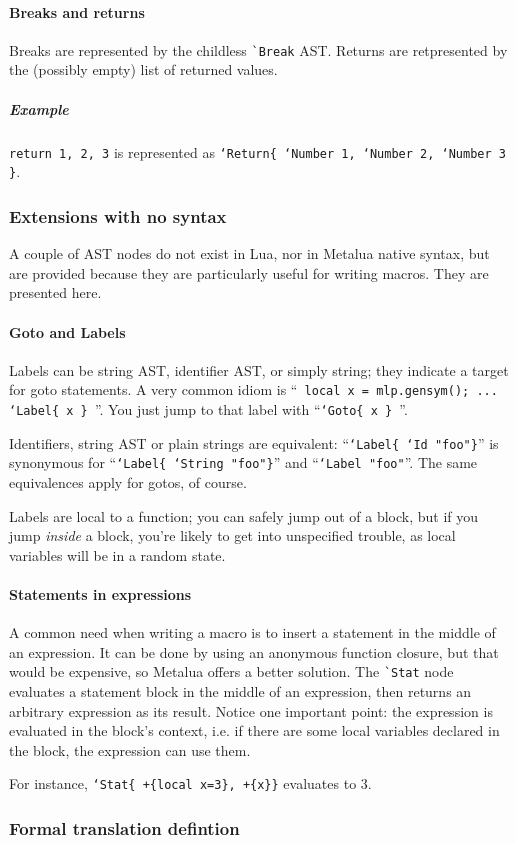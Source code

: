 \paragraph{Breaks and returns} 
Breaks are represented by the childless \verb|`Break| AST. Returns are
retpresented by the (possibly empty) list of returned values.

\subparagraph{Example}
{\tt return 1, 2, 3} is represented as {\tt`Return\{ `Number 1, `Number
    2, `Number 3 \}}.

\subsubsection{Extensions with no syntax}

A couple of AST nodes do not exist in Lua, nor in Metalua native
syntax, but are provided because they are particularly useful for
writing macros. They are presented here.

\paragraph{Goto and Labels}

Labels can be string AST, identifier AST, or simply string; they
indicate a target for goto statements.  A very common idiom is ``{\tt
  local x = mlp.gensym(); ... `Label\{ x \} }''. You just jump to that
label with ``{\tt `Goto\{ x \} }''.

Identifiers, string AST or plain strings are equivalent: 
``{\tt`Label\{ `Id "foo"\}}'' is synonymous for ``{\tt`Label\{ `String
  "foo"\}}'' and ``{\tt`Label "foo"}''. The same equivalences apply
for gotos, of course.

Labels are local to a function; you can safely jump out of a block,
but if you jump {\em inside} a block, you're likely to get into unspecified
trouble, as local variables will be in a random state.

\paragraph{Statements in expressions}
A common need when writing a macro is to insert a statement in the
middle of an expression. It can be done by using an anonymous function
closure, but that would be expensive, so Metalua offers a better
solution. The \verb|`Stat| node evaluates a statement block in the
middle of an expression, then returns an arbitrary expression as its
result. Notice one important point: the expression is evaluated in
the block's context, i.e. if there are some local variables declared
in the block, the expression can use them.

For instance, {\tt `Stat\{ +\{local x=3\}, +\{x\}\}} evaluates to 3.

\subsubsection{Formal translation defintion}


